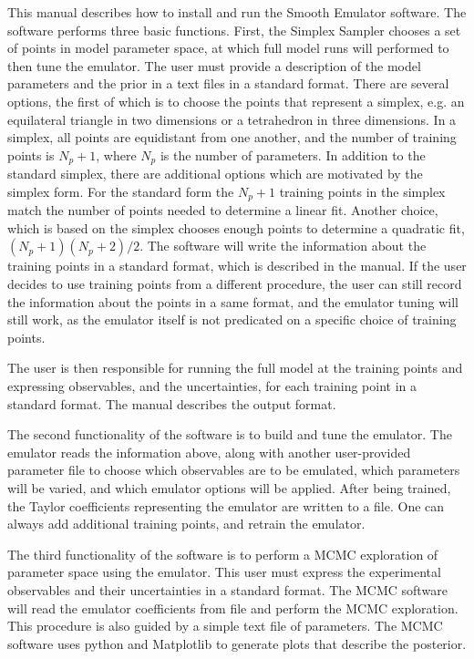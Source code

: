 \documentclass[12pt]{article}
\numberwithin{equation}{section}
\numberwithin{figure}{section}
\begin{document}
This manual describes how to install and run the Smooth Emulator software. The software performs three basic functions. First, the Simplex Sampler chooses a set of points in model parameter space, at which full model runs will performed to then tune the emulator. The user must provide a description of the model parameters and the prior in a text files in a standard format. There are several options, the first of which is to choose the points that represent a simplex, e.g. an equilateral triangle in two dimensions or a tetrahedron in three dimensions. In a simplex, all points are equidistant from one another, and the number of training points is $N_p+1$, where $N_p$ is the number of parameters. In addition to the standard simplex, there are additional options which are motivated by the simplex form. For the standard form the  $N_p+1$ training points in the simplex match the number of points needed to determine a linear fit. Another choice, which is based on the simplex chooses enough points to determine a quadratic fit, $(N_p+1)(N_p+2)/2$. The software will write the information about the training points in a standard format, which is described in the manual. If the user decides to use training points from a different procedure, the user can still record the information about the points in a same format, and the emulator tuning will still work, as the emulator itself is not predicated on a specific choice of training points.

 The user is then responsible for running the full model at the training points and expressing observables, and the uncertainties, for each training point in a standard format. The manual describes the output format.

 The second functionality of the software is to build and tune the emulator. The emulator reads the information above, along with another user-provided parameter file to choose which observables are to be emulated, which parameters will be varied, and which emulator options will be applied. After being trained, the Taylor coefficients representing the emulator are written to a file. One can always add additional training points, and retrain the emulator. 

The third functionality of the software is to perform a MCMC exploration of parameter space using the emulator. This user must express the experimental observables and their uncertainties in a standard format. The MCMC software will read the emulator coefficients from file and perform the MCMC exploration. This procedure is also guided by a simple text file of parameters. The MCMC software uses python and Matplotlib to generate plots that describe the posterior. 
\end{document}
